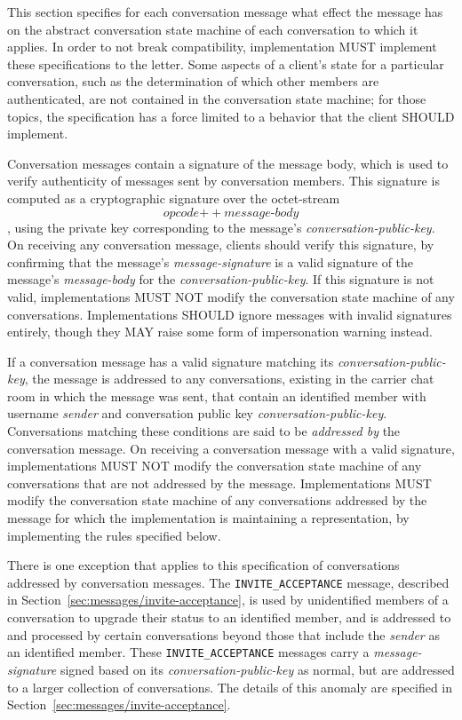 \documentclass{article}
\def\message#1{\texttt{#1}}
\def\field#1{\textit{#1}}
\def\concat{\mathbin{+\!\!\!+}}
\begin{document}
This section specifies for each conversation message what effect the message has on the abstract conversation state machine of each conversation to which it applies.
In order to not break compatibility, implementation MUST implement these specifications to the letter.
Some aspects of a client's state for a particular conversation, such as the determination of which other members are authenticated, are not contained in the conversation state machine; for those topics, the specification has a force limited to a behavior that the client SHOULD implement.

Conversation messages contain a signature of the message body, which is used to verify authenticity of messages sent by conversation members.
This signature is computed as a cryptographic signature over the octet-stream
$$\field{opcode} \concat \field{message-body}$$
, using the private key corresponding to the message's \field{conversation-public-key}.
On receiving any conversation message, clients should verify this signature, by confirming that the message's \field{message-signature} is a valid signature of the message's \field{message-body} for the \field{conversation-public-key}.
If this signature is not valid, implementations MUST NOT modify the conversation state machine of any conversations.
Implementations SHOULD ignore messages with invalid signatures entirely, though they MAY raise some form of impersonation warning instead.

If a conversation message has a valid signature matching its \field{conversation-public-key}, the message is addressed to any conversations, existing in the carrier chat room in which the message was sent, that contain an identified member with username \field{sender} and conversation public key \field{conversation-public-key}.
Conversations matching these conditions are said to be \emph{addressed by} the conversation message.
On receiving a conversation message with a valid signature, implementations MUST NOT modify the conversation state machine of any conversations that are not addressed by the message.
Implementations MUST modify the conversation state machine of any conversations addressed by the message for which the implementation is maintaining a representation, by implementing the rules specified below.

There is one exception that applies to this specification of conversations addressed by conversation messages.
The \message{INVITE\_ACCEPTANCE} message, described in Section~\ref{sec:messages/invite-acceptance}, is used by unidentified members of a conversation to upgrade their status to an identified member, and is addressed to and processed by certain conversations beyond those that include the \field{sender} as an identified member.
These \message{INVITE\_ACCEPTANCE} messages carry a \field{message-signature} signed based on its \field{conversation-public-key} as normal, but are addressed to a larger collection of conversations.
The details of this anomaly are specified in Section~\ref{sec:messages/invite-acceptance}.
\end{document}
